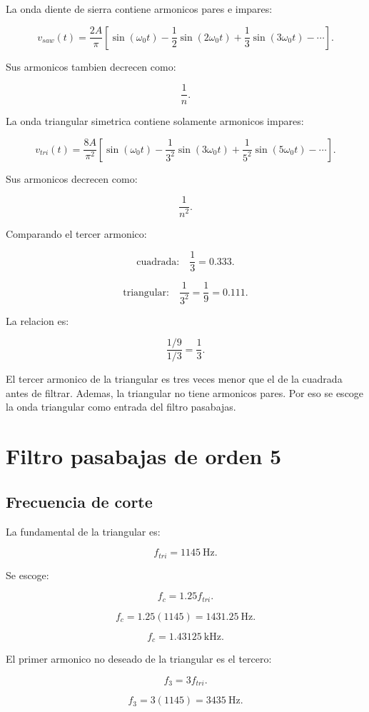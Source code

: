 \documentclass[11pt,letterpaper]{article}
\begin{document}
La onda diente de sierra contiene armonicos pares e impares:

\[
v_{saw}(t)=
\frac{2A}{\pi}
\left[
\sin(\omega_0 t)
-\frac{1}{2}\sin(2\omega_0 t)
+\frac{1}{3}\sin(3\omega_0 t)
-\cdots
\right].
\]

Sus armonicos tambien decrecen como:

\[
\frac{1}{n}.
\]

La onda triangular simetrica contiene solamente armonicos impares:

\[
v_{tri}(t)=
\frac{8A}{\pi^2}
\left[
\sin(\omega_0 t)
-\frac{1}{3^2}\sin(3\omega_0 t)
+\frac{1}{5^2}\sin(5\omega_0 t)
-\cdots
\right].
\]

Sus armonicos decrecen como:

\[
\frac{1}{n^2}.
\]

Comparando el tercer armonico:

\[
\text{cuadrada:}\quad \frac{1}{3}=0.333.
\]

\[
\text{triangular:}\quad \frac{1}{3^2}=\frac{1}{9}=0.111.
\]

La relacion es:

\[
\frac{1/9}{1/3}=\frac{1}{3}.
\]

El tercer armonico de la triangular es tres veces menor que el de la cuadrada
antes de filtrar. Ademas, la triangular no tiene armonicos pares. Por eso se
escoge la onda triangular como entrada del filtro pasabajas.

\section{Filtro pasabajas de orden 5}

\subsection{Frecuencia de corte}

La fundamental de la triangular es:

\[
f_{tri}=1145~\text{Hz}.
\]

Se escoge:

\[
f_c=1.25f_{tri}.
\]

\[
f_c=1.25(1145)=1431.25~\text{Hz}.
\]

\[
\boxed{f_c=1.43125~\text{kHz}}.
\]

El primer armonico no deseado de la triangular es el tercero:

\[
f_3=3f_{tri}.
\]

\[
f_3=3(1145)=3435~\text{Hz}.
\]
\end{document}
